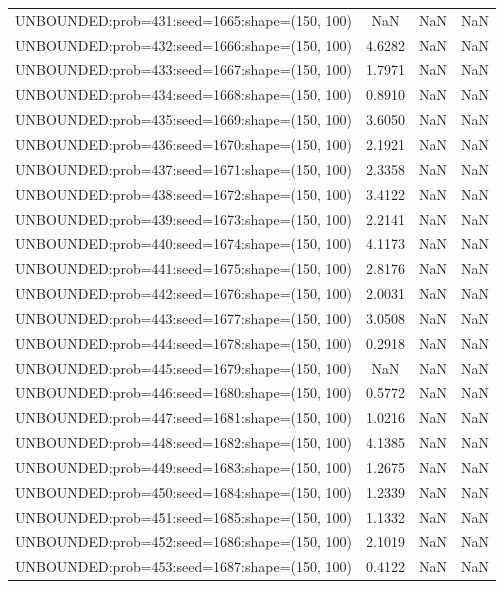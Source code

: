 \begin{longtable}{lccc}
UNBOUNDED:prob=431:seed=1665:shape=(150, 100) &     NaN &   NaN &    NaN \\
UNBOUNDED:prob=432:seed=1666:shape=(150, 100) &  4.6282 &   NaN &    NaN \\
UNBOUNDED:prob=433:seed=1667:shape=(150, 100) &  1.7971 &   NaN &    NaN \\
UNBOUNDED:prob=434:seed=1668:shape=(150, 100) &  0.8910 &   NaN &    NaN \\
UNBOUNDED:prob=435:seed=1669:shape=(150, 100) &  3.6050 &   NaN &    NaN \\
UNBOUNDED:prob=436:seed=1670:shape=(150, 100) &  2.1921 &   NaN &    NaN \\
UNBOUNDED:prob=437:seed=1671:shape=(150, 100) &  2.3358 &   NaN &    NaN \\
UNBOUNDED:prob=438:seed=1672:shape=(150, 100) &  3.4122 &   NaN &    NaN \\
UNBOUNDED:prob=439:seed=1673:shape=(150, 100) &  2.2141 &   NaN &    NaN \\
UNBOUNDED:prob=440:seed=1674:shape=(150, 100) &  4.1173 &   NaN &    NaN \\
UNBOUNDED:prob=441:seed=1675:shape=(150, 100) &  2.8176 &   NaN &    NaN \\
UNBOUNDED:prob=442:seed=1676:shape=(150, 100) &  2.0031 &   NaN &    NaN \\
UNBOUNDED:prob=443:seed=1677:shape=(150, 100) &  3.0508 &   NaN &    NaN \\
UNBOUNDED:prob=444:seed=1678:shape=(150, 100) &  0.2918 &   NaN &    NaN \\
UNBOUNDED:prob=445:seed=1679:shape=(150, 100) &     NaN &   NaN &    NaN \\
UNBOUNDED:prob=446:seed=1680:shape=(150, 100) &  0.5772 &   NaN &    NaN \\
UNBOUNDED:prob=447:seed=1681:shape=(150, 100) &  1.0216 &   NaN &    NaN \\
UNBOUNDED:prob=448:seed=1682:shape=(150, 100) &  4.1385 &   NaN &    NaN \\
UNBOUNDED:prob=449:seed=1683:shape=(150, 100) &  1.2675 &   NaN &    NaN \\
UNBOUNDED:prob=450:seed=1684:shape=(150, 100) &  1.2339 &   NaN &    NaN \\
UNBOUNDED:prob=451:seed=1685:shape=(150, 100) &  1.1332 &   NaN &    NaN \\
UNBOUNDED:prob=452:seed=1686:shape=(150, 100) &  2.1019 &   NaN &    NaN \\
UNBOUNDED:prob=453:seed=1687:shape=(150, 100) &  0.4122 &   NaN &    NaN \\

\end{longtable}
